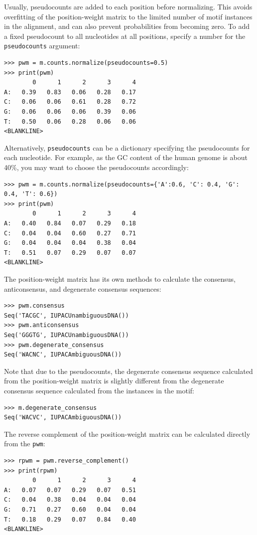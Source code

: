 \documentclass{report}
\begin{document}
Usually, pseudocounts are added to each position before normalizing.
This avoids overfitting of the position-weight matrix to the limited
number of motif instances in the alignment, and can also prevent
probabilities from becoming zero. To add a fixed pseudocount to all
nucleotides at all positions, specify a number for the
\verb+pseudocounts+ argument:
\begin{verbatim}
>>> pwm = m.counts.normalize(pseudocounts=0.5)
>>> print(pwm)
        0      1      2      3      4
A:   0.39   0.83   0.06   0.28   0.17
C:   0.06   0.06   0.61   0.28   0.72
G:   0.06   0.06   0.06   0.39   0.06
T:   0.50   0.06   0.28   0.06   0.06
<BLANKLINE>
\end{verbatim}
Alternatively, \verb+pseudocounts+ can be a dictionary specifying the
pseudocounts for each nucleotide. For example, as the GC content of
the human genome is about 40\%, you may want to choose the
pseudocounts accordingly:
\begin{verbatim}
>>> pwm = m.counts.normalize(pseudocounts={'A':0.6, 'C': 0.4, 'G': 0.4, 'T': 0.6})
>>> print(pwm)
        0      1      2      3      4
A:   0.40   0.84   0.07   0.29   0.18
C:   0.04   0.04   0.60   0.27   0.71
G:   0.04   0.04   0.04   0.38   0.04
T:   0.51   0.07   0.29   0.07   0.07
<BLANKLINE>
\end{verbatim}
The position-weight matrix has its own methods to calculate the
consensus, anticonsensus, and degenerate consensus sequences:
\begin{verbatim}
>>> pwm.consensus
Seq('TACGC', IUPACUnambiguousDNA())
>>> pwm.anticonsensus
Seq('GGGTG', IUPACUnambiguousDNA())
>>> pwm.degenerate_consensus
Seq('WACNC', IUPACAmbiguousDNA())
\end{verbatim}
Note that due to the pseudocounts, the degenerate consensus sequence
calculated from the position-weight matrix is slightly different
from the degenerate consensus sequence calculated from the instances
in the motif:
\begin{verbatim}
>>> m.degenerate_consensus
Seq('WACVC', IUPACAmbiguousDNA())
\end{verbatim}
The reverse complement of the position-weight matrix can be calculated directly from the \verb+pwm+:
\begin{verbatim}
>>> rpwm = pwm.reverse_complement()
>>> print(rpwm)
        0      1      2      3      4
A:   0.07   0.07   0.29   0.07   0.51
C:   0.04   0.38   0.04   0.04   0.04
G:   0.71   0.27   0.60   0.04   0.04
T:   0.18   0.29   0.07   0.84   0.40
<BLANKLINE>
\end{verbatim}
\end{document}
